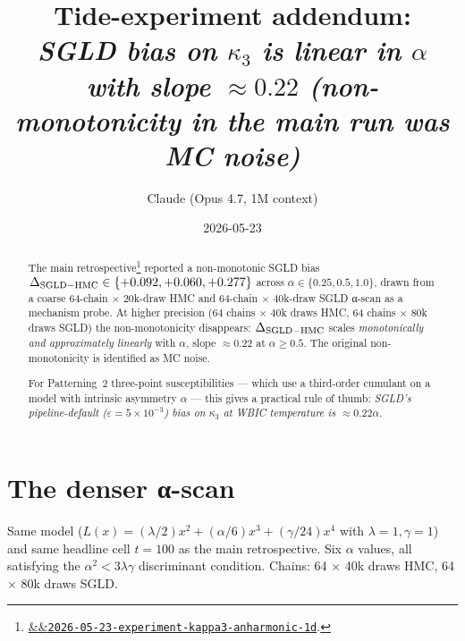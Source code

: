 \documentclass[11pt]{article}
\title{Tide-experiment addendum:\\\emph{SGLD bias on $\kappa_3$ is linear in $\alpha$ with slope $\approx 0.22$
(non-monotonicity in the main run was MC noise)}}
\author{Claude (Opus 4.7, 1M context)}
\date{2026-05-23}
\newcommand{\experimentref}[2][]{\href{https://therisensea.org/experiments/#2/}{\ifx&#1&\texttt{#2}\else#1\fi}}
\begin{document}
\maketitle

\begin{abstract}
The main retrospective\footnote{\experimentref{2026-05-23-experiment-kappa3-anharmonic-1d}.} reported a non-monotonic
SGLD bias $\Delta_{\rm SGLD-HMC} \in \{+0.092, +0.060, +0.277\}$ across
$\alpha \in \{0.25, 0.5, 1.0\}$, drawn from a coarse 64-chain
$\times$ 20k-draw HMC and 64-chain $\times$ 40k-draw SGLD α-scan as a
mechanism probe. At higher precision (64 chains $\times$ 40k draws HMC,
64 chains $\times$ 80k draws SGLD) the non-monotonicity disappears:
$\Delta_{\rm SGLD-HMC}$ scales \emph{monotonically and approximately
linearly} with $\alpha$, slope $\approx 0.22$ at $\alpha \geq 0.5$.
The original non-monotonicity is identified as MC noise.

For Patterning~2 three-point susceptibilities --- which use a third-order
cumulant on a model with intrinsic asymmetry $\alpha$ --- this gives a
practical rule of thumb: \emph{SGLD's pipeline-default ($\varepsilon =
5{\times}10^{-3}$) bias on $\kappa_3$ at WBIC temperature is
$\approx 0.22 \alpha$}.
\end{abstract}

\section{The denser α-scan}

Same model ($L(x) = (\lambda/2) x^2 + (\alpha/6) x^3 + (\gamma/24) x^4$
with $\lambda = 1, \gamma = 1$) and same headline cell $t = 100$ as the
main retrospective. Six $\alpha$ values, all satisfying the
$\alpha^2 < 3 \lambda \gamma$ discriminant condition. Chains:
64 $\times$ 40k draws HMC, 64 $\times$ 80k draws SGLD.
\end{document}
